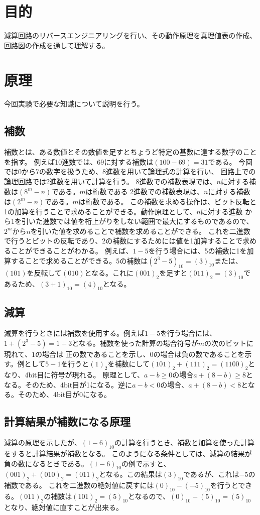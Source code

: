 \documentclass[a4paper,11pt]{ltjsarticle}
\begin{document}
\section{目的}
減算回路のリバースエンジニアリングを行い、その動作原理を真理値表の作成、回路図の作成を通して理解する。
\section{原理}
今回実験で必要な知識について説明を行う。
\subsection{補数}
補数とは、ある数値とその数値を足すとちょうど特定の基数に達する数字のことを指す。
例えば10進数では、$69$に対する補数は$(100 - 69) = 31$である。
今回では0から7の数字を扱うため、8進数を用いて論理式の計算を行い、
回路上での論理回路では2進数を用いて計算を行う。
8進数での補数表現では、$n$に対する補数は$(8^m - n)$である。$m$は桁数である
2進数での補数表現は、$n$に対する補数は$(2^m - n)$である。$m$は桁数である。
この補数を求める操作は、ビット反転と1の加算を行うことで求めることができる。動作原理として、$n$に対する進数
から1を引いた進数では値を桁上がりをしない範囲で最大にするものであるので、$2^m$から$n$を引いた値を求めることで補数を求めることができる。
これを二進数で行うとビットの反転であり、2の補数にするためには値を1加算することで求めることができることがわかる。
例えば、$1 - 5$を行う場合には、5の補数に1を加算することで求めることができる。5の補数は$(2^3 - 5)_{10}= (3)_{10}$または、$(101)$を反転して$(010)$となる。これに$(001)_2$を足すと$(011)_2 = (3)_{10}$であるため、$(3 + 1)_{10} = (4)_{10}$となる。
\subsection{減算}
減算を行うときには補数を使用する。例えば$1 - 5$を行う場合には、$1 + (2^3 - 5) = 1 + 3$となる。補数を使った計算の場合符号が$m$の次のビットに現れて、$1$の場合は
正の数であることを示し、$0$の場合は負の数であることを示す。例として$5 - 1$を行うと$(1)_2$を補数にして$ (101)_2 + (111)_2 = (1100)_2$となり、4bit目に符号が現れる。
原理として、$a - b \geq 0$の場合$ a + (8 - b) \geq 8$となる。そのため、4bit目が1になる。逆に$a - b < 0$の場合、$a + (8 - b) < 8$となる。そのため、4bit目が0になる。
\subsection{計算結果が補数になる原理}
減算の原理を示したが、$(1-6)_{10}$の計算を行うとき、補数と加算を使った計算をすると計算結果が補数となる。
このようになる条件としては、減算の結果が負の数になるときである。$(1 - 6)_{10}$の例で示すと、$(001)_2 + (010)_2 = (011)_2$となる。この結果は$(3)_{10}$であるが、これは$-5$の補数である。
これを二進数の絶対値に戻すには$(0)_{10} -(- 5)_{10}$を行うとできる。$(011)_2$の補数は$(101)_2 = (5)_{10}$となるので、$(0)_{10} + (5)_{10} = (5)_{10} $となり、絶対値に直すことが出来る。
\end{document}
